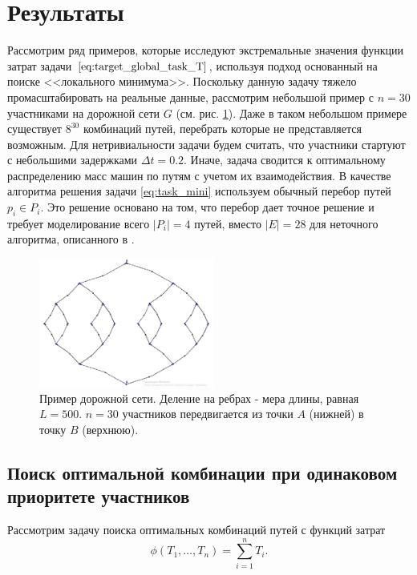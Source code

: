 \documentclass[12pt, a4paper]{article}
\begin{document}
\newpage
\section{Результаты}

Рассмотрим ряд примеров, которые исследуют экстремальные значения функции затрат задачи $\eqref{eq:target_global_task_T}$, используя подход основанный на поиске <<локального минимума>>. Поскольку данную задачу тяжело промасштабировать на реальные данные, рассмотрим небольшой пример с $n = 30$ участниками на дорожной сети $G$ (см. рис. \ref{ris:graph_average}). Даже в таком небольшом примере существует $8^{30}$ комбинаций путей, перебрать которые не представляется возможным.  Для нетривиальности задачи будем считать, что участники стартуют с небольшими задержками $\Delta t = 0.2$. Иначе, задача сводится к оптимальному распределению масс машин по путям с учетом их взаимодействия. В качестве алгоритма решения задачи \eqref{eq:task_mini} используем обычный перебор путей $p_i \in P_i$. Это решение основано на том, что перебор дает точное решение и требует моделирование всего $|P_i| = 4$ путей, вместо $|E| = 28$ для неточного алгоритма, описанного в \cite{Luba}. 
\begin{figure}[H]
	\begin{center}
		\includegraphics[width = .5\linewidth, height=120pt]{imgs/graph_simple.jpg}
		\caption{Пример дорожной сети. Деление на ребрах - мера длины, равная $L = 500$. $n = 30$ участников передвигается из точки $A$ (нижней) в точку $B$ (верхнюю). }
		\label{ris:graph_average}
	\end{center}
\end{figure}

\subsection{Поиск оптимальной комбинации при одинаковом приоритете участников}

Рассмотрим задачу поиска оптимальных комбинаций путей с функций затрат 
\begin{equation*}
	\phi(T_1, \ldots, T_n) = \sum\limits_{i = 1}^nT_i.
\end{equation*}
\end{document}
